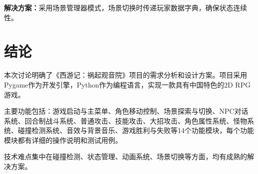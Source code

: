 \documentclass[a4paper,12pt]{article}
\begin{document}
\textbf{解决方案：}采用场景管理器模式，场景切换时传递玩家数据字典，确保状态连续性。

\section{结论}

本次讨论明确了《西游记：祸起观音院》项目的需求分析和设计方案。项目采用Pygame作为开发引擎，Python作为编程语言，实现一款具有中国特色的2D RPG游戏。

主要功能包括：游戏启动与主菜单、角色移动控制、场景探索与切换、NPC对话系统、回合制战斗系统、普通攻击、技能攻击、大招攻击、角色属性系统、怪物系统、碰撞检测系统、音效与背景音乐、游戏胜利与失败等14个功能模块，每个功能模块都有详细的操作说明和测试用例。

技术难点集中在碰撞检测、状态管理、动画系统、场景切换等方面，均有成熟的解决方案。
\end{document}
